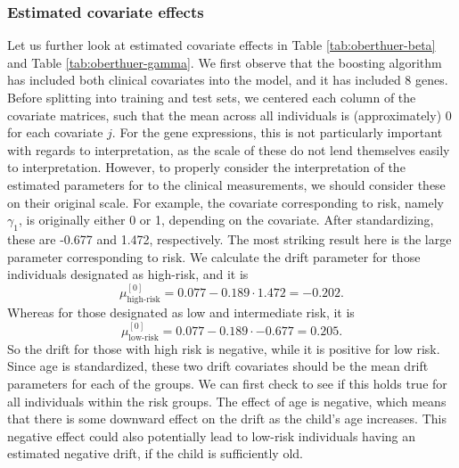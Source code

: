 \subsubsection{Estimated covariate effects}
Let us further look at estimated covariate effects in Table \ref{tab:oberthuer-beta} and Table \ref{tab:oberthuer-gamma}.
We first observe that the boosting algorithm has included both clinical covariates into the model, and it has included 8 genes.
Before splitting into training and test sets, we centered each column of the covariate matrices, such that the mean across all individuals is (approximately) 0 for each covariate $j$.
For the gene expressions, this is not particularly important with regards to interpretation, as the scale of these do not lend themselves easily to interpretation.
However, to properly consider the interpretation of the estimated parameters for to the clinical measurements, we should consider these on their original scale.
For example, the covariate corresponding to risk, namely $\gamma_1$, is originally either 0 or 1, depending on the covariate.
After standardizing, these are -0.677 and 1.472, respectively.
The most striking result here is the large parameter corresponding to risk.
We calculate the drift parameter for those individuals designated as high-risk, and it is
\begin{equation*}
    \mu^{[0]}_{\text{high-risk}}=0.077-0.189\cdot1.472=-0.202.
\end{equation*}
Whereas for those designated as low and intermediate risk, it is
\begin{equation*}
    \mu^{[0]}_{\text{low-risk}}=0.077-0.189\cdot-0.677=0.205.
\end{equation*}
So the drift for those with high risk is negative, while it is positive for low risk.
Since age is standardized, these two drift covariates should be the mean drift parameters for each of the groups.
We can first check to see if this holds true for all individuals within the risk groups.
The effect of age is negative, which means that there is some downward effect on the drift as the child's age increases.
This negative effect could also potentially lead to low-risk individuals having an estimated negative drift, if the child is sufficiently old.
